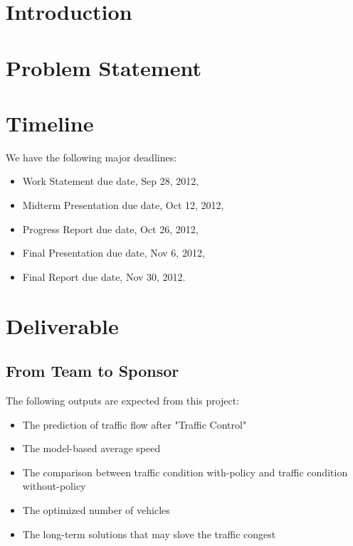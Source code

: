 \documentclass[12pt,letterpaper]{article}
\theoremstyle{definition}
\begin{document}
\def\shiftdowna{0.32in}  %
\def\shiftdownb{0.22in}  %


\section{Introduction} 



\section{Problem Statement}

  

  
\section{Timeline}
We have the following major deadlines:
\begin{itemize}
    \item Work Statement due date, Sep 28, 2012,
    \item Midterm Presentation due date, Oct 12, 2012,
    \item Progress Report due date, Oct 26, 2012,
    \item Final Presentation due date, Nov 6, 2012,
    \item Final Report due date, Nov 30, 2012.
\end{itemize}

\section{Deliverable}
\subsection{From Team to Sponsor} %
The following outputs are expected from this project:
\begin{itemize}
    \item The prediction of traffic flow after "Traffic Control" 
    \item The model-based average speed
    \item The comparison between traffic condition with-policy and traffic condition without-policy
    \item The optimized number of vehicles 
    \item The long-term solutions that may slove the traffic congest
\end{itemize}
\end{document}
